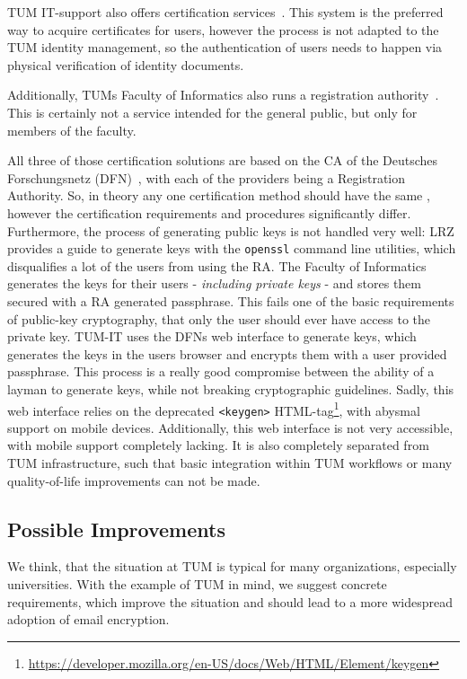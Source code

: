 TUM IT-support also offers certification services~\cite{tumZertifikat}.
This system is the preferred way to acquire certificates for users, however the process is not adapted to the TUM
identity management, so the authentication of users needs to happen via physical verification of identity documents.

Additionally, TUMs Faculty of Informatics also runs a registration authority~\cite{inTumCertificates}.
This is certainly not a service intended for the general public, but only for members of the faculty.

All three of those certification solutions are based on the CA of the Deutsches For\-schungs\-netz (DFN)~\cite{dfnPki},
with each of the providers being a Registration Authority.
So, in theory any one certification method should have the same , however the certification requirements and
procedures significantly differ.
Furthermore, the process of generating public keys is not handled very well: LRZ provides a guide to generate keys with
the \lstinline{openssl} command line utilities, which disqualifies a lot of the users from using the RA\@.
The Faculty of Informatics generates the keys for their users - \emph{including private keys} - and stores them secured
with a RA generated passphrase.
This fails one of the basic requirements of public-key cryptography, that only the user should ever have access to the
private key.
TUM-IT uses the DFNs web interface to generate keys, which generates the keys in the users browser and encrypts them
with a user provided passphrase.
This process is a really good compromise between the ability of a layman to generate keys, while not breaking
cryptographic guidelines.
Sadly, this web interface relies on the deprecated \lstinline{<keygen>}
HTML-tag\footnote{\url{https://developer.mozilla.org/en-US/docs/Web/HTML/Element/keygen}}, with abysmal support on
mobile devices.
Additionally, this web interface is not very accessible, with mobile support completely lacking.
It is also completely separated from TUM infrastructure, such that basic integration within TUM workflows or many
quality-of-life improvements can not be made.

\subsection*{Possible Improvements}
We think, that the situation at TUM is typical for many organizations, especially universities.
With the example of TUM in mind, we suggest concrete requirements, which improve the situation and should lead to a
more widespread adoption of email encryption.

